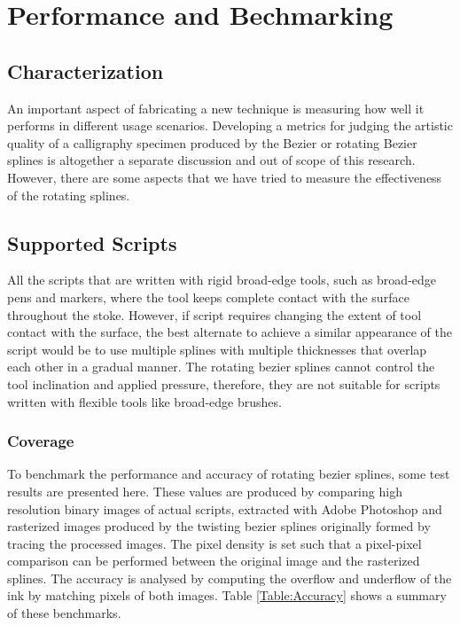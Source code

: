 \section{Performance and Bechmarking}
\label{Chapter:Performance}

\subsection{Characterization}
An important aspect of fabricating a new technique is measuring how well it performs in different usage scenarios. Developing a metrics for judging the artistic quality of a calligraphy specimen produced by the Bezier or rotating Bezier splines is altogether a separate discussion and out of scope of this research. However, there are some aspects that we have tried to measure the effectiveness of the rotating splines.

\subsection{Supported Scripts}
All the scripts that are written with rigid broad-edge tools, such as broad-edge pens and markers, where the tool keeps complete contact with the surface throughout the stoke. However, if script requires changing the extent of tool contact with the surface, the best alternate to achieve a similar appearance of the script would be to use multiple splines with multiple thicknesses that overlap each other in a gradual manner. The rotating bezier splines cannot control the tool inclination and applied pressure, therefore, they are not suitable for scripts written with flexible tools like broad-edge brushes.

\subsubsection{Coverage}
To benchmark the performance and accuracy of rotating bezier splines, some test results are presented here. These values are produced by comparing high resolution binary images of actual scripts, extracted with Adobe Photoshop and rasterized images produced by the twisting bezier splines originally formed by tracing the processed images. The pixel density is set such that a pixel-pixel comparison can be performed between the original image and the rasterized splines. The accuracy is analysed by computing the overflow and underflow of the ink by matching pixels of both images. Table \ref{Table:Accuracy} shows a summary of these benchmarks.

